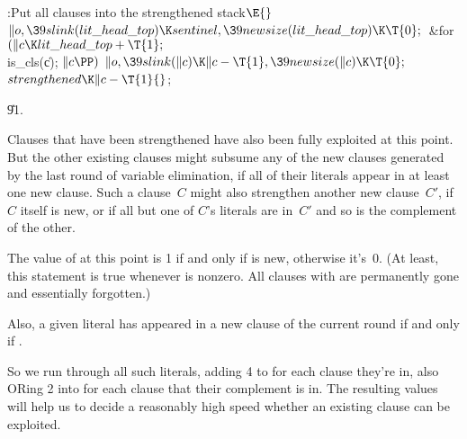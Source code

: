 \Y\B\4:Put all clauses into the strengthened stack\X${}\E{}$\6
$\|o,\39\\{slink}(\\{lit\_head\_top})\K\\{sentinel},\39\\{newsize}(\\{lit\_head%
\_top})\K\T{0};{}$\6
\&{for} ${}(\|c\K\\{lit\_head\_top}+\T{1};{}$ \\{is\_cls}(\|c); ${}\|c\PP){}$\1%
\5
${}\|o,\39\\{slink}(\|c)\K\|c-\T{1},\39\\{newsize}(\|c)\K\T{0};{}$\2\6
${}\\{strengthened}\K\|c-\T{1}{}$;\par
\U91.\fi

Clauses that have been strengthened have also been fully
exploited at
this point. But the other existing clauses might subsume any of the new clauses
generated by the last round of variable elimination, if all of their
literals appear in at least one new clause. Such a clause~$C$
might also strengthen another new clause~$C'$, if $C$ itself is new,
or if all but one of $C$'s literals are in~$C'$ and so is the complement
of the other.

The value of  at this point is 1 if and only if 
is new,
otherwise it's~0. (At least, this statement is true whenever 
is nonzero. All clauses with  are permanently gone
and
essentially forgotten.)

Also, a given literal  has appeared in a new clause of the current
round if and only if .

So we run through all such literals, adding 4 to  for
each clause they're in, also {\mc OR}ing 2 into  for
each clause that their complement is in. The resulting  values
will help us to decide a reasonably high speed whether an existing
clause can be exploited.

